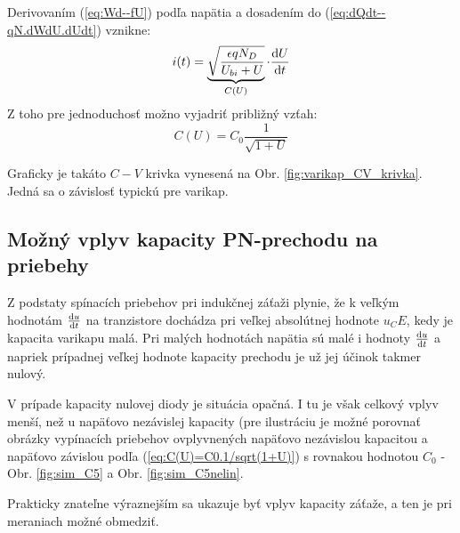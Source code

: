 Derivovaním (\ref{eq:Wd--fU}) podľa napätia a dosadením do (\ref{eq:dQdt--qN.dWdU.dUdt}) vznikne:
\begin{equation}
    i(t) = \underbrace{\sqrt{\frac{\epsilon q N_D}{U_{bi} + U}}}_{C(U)} \cdot \frac{\mathrm{d} U}{\mathrm{d} t}
    \label{eq:i--C(U)dUdt}
\end{equation}
Z toho pre jednoduchosť možno vyjadriť približný vzťah:
\begin{equation}
    C(U) = C_0 \frac{1}{\sqrt{1+U}}
    \label{eq:C(U)=C0.1/sqrt(1+U)}
\end{equation}


Graficky je takáto $C-V$ krivka vynesená na Obr. \ref{fig:varikap_CV_krivka}. Jedná sa o závislosť typickú pre varikap.


\subsection{Možný vplyv kapacity PN-prechodu na priebehy}
Z podstaty spínacích priebehov pri indukčnej záťaži plynie, že k veľkým hodnotám $\frac{\mathrm{d} u}{\mathrm{d} t}$ na tranzistore dochádza pri veľkej absolútnej hodnote $u_CE$, kedy je kapacita varikapu malá. Pri malých hodnotách napätia sú malé i hodnoty $\frac{\mathrm{d} u}{\mathrm{d} t}$ a napriek prípadnej veľkej hodnote kapacity prechodu je už jej účinok takmer nulový.

V prípade kapacity nulovej diody je situácia opačná. I tu je však celkový vplyv menší, než u napäťovo nezávislej kapacity (pre ilustráciu je možné porovnať obrázky vypínacích priebehov ovplyvnených napäťovo nezávislou kapacitou a napäťovo závislou podľa (\ref{eq:C(U)=C0.1/sqrt(1+U)}) s rovnakou hodnotou $C_0$ - Obr. \ref{fig:sim_C5} a Obr. \ref{fig:sim_C5nelin}.

Prakticky znateľne výraznejším sa ukazuje byť vplyv kapacity záťaže, a ten je pri meraniach možné obmedziť.




